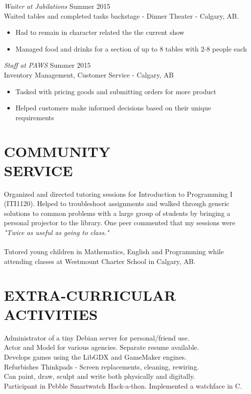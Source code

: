 \documentclass[margin]{res}
\begin{document}
\begin{resume}
                {\sl Waiter at Jubilations} \hfill        Summer 2015 \\
               	Waited tables and completed tasks backstage - Dinner Theater - Calgary, AB.
\begin{itemize}  \itemsep -2pt %
                 \item Had to remain in character related the the current show
                 \item Managed food and drinks for a section of up to 8 tables with 2-8 people each
                 \end{itemize} 
                   
                {\sl Staff at PAWS} \hfill        Summer 2015 \\
Inventory Management, Customer Service - Calgary, AB      
\begin{itemize}  \itemsep -2pt %
                 \item Tasked with pricing goods and submitting orders for more product
                 \item Helped customers make informed decisions based on their unique requirements
                 \end{itemize}          	

 \section{COMMUNITY \\ SERVICE}  Organized and directed tutoring sessions for Introduction to Programming I (ITI1120). Helped to troubleshoot assignments and walked through generic solutions to common problems with a large group of students by bringing a personal projector to the library. One peer commented that my sessions were {\sl "Twice as useful as going to class."}\\
\\Tutored young children in Mathematics, English and Programming while attending classes at Westmount Charter School in Calgary, AB.


\section{EXTRA-CURRICULAR \\ ACTIVITIES}        
Administrator of a tiny Debian server for personal/friend use.\\     
           	Actor and Model for various agencies. Separate resume available.\\
           	Develops games using the LibGDX and GameMaker engines. \\
           	Refurbishes Thinkpads - Screen replacements, cleaning, rewiring.\\
           	Can paint, draw, sculpt and write both physically and digitally.\\
           	Participant in Pebble Smartwatch Hack-a-thon. Implemented a watchface in C.
           	

\end{resume}
\end{document}
